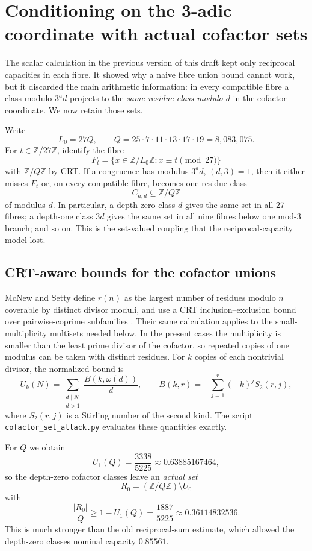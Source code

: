 \documentclass[11pt]{article}
\theoremstyle{definition}
\newcommand{\Z}{\mathbb Z}
\begin{document}
\section{Conditioning on the 3-adic coordinate with actual cofactor sets}\label{sec:cofactor}

The scalar calculation in the previous version of this draft kept only reciprocal capacities in
each fibre.  It showed why a naive fibre union bound cannot work, but it discarded the main
arithmetic information: in every compatible fibre a class modulo $3^a d$ projects to the
\emph{same residue class modulo $d$} in the cofactor coordinate.  We now retain those sets.

Write
\[
 L_0=27Q,\qquad Q=25\cdot7\cdot11\cdot13\cdot17\cdot19=8{,}083{,}075.
\]
For $t\in\Z/27\Z$, identify the fibre
\[
 F_t=\{x\in\Z/L_0\Z:x\equiv t\pmod{27}\}
\]
with $\Z/Q\Z$ by CRT.  If a congruence has modulus $3^a d$, $(d,3)=1$, then it either misses
$F_t$ or, on every compatible fibre, becomes one residue class
\[
 C_{a,d}\subseteq \Z/Q\Z
\]
of modulus $d$.  In particular, a depth-zero class $d$ gives the same set in all 27 fibres; a
depth-one class $3d$ gives the same set in all nine fibres below one mod-$3$ branch; and so on.
This is the set-valued coupling that the reciprocal-capacity model lost.

\subsection{CRT-aware bounds for the cofactor unions}

McNew and Setty define $r(n)$ as the largest number of residues modulo $n$ coverable by
distinct divisor moduli, and use a CRT inclusion--exclusion bound over pairwise-coprime
subfamilies \cite{McNewSetty2026}.  Their same calculation applies to the small-multiplicity
multisets needed below.  In the present cases the multiplicity is smaller than the least prime
divisor of the cofactor, so repeated copies of one modulus can be taken with distinct residues.
For $k$ copies of each nontrivial divisor, the normalized bound is
\[
 U_k(N)=\sum_{\substack{d\mid N\\d>1}}
 \frac{B(k,\omega(d))}{d},
 \qquad
 B(k,r)=-\sum_{j=1}^{r}(-k)^j S_2(r,j),
\]
where $S_2(r,j)$ is a Stirling number of the second kind.  The script
\texttt{cofactor\_set\_attack.py} evaluates these quantities exactly.

For $Q$ we obtain
\[
 U_1(Q)=\frac{3338}{5225}\approx0.63885167464,
\]
so the depth-zero cofactor classes leave an \emph{actual set}
\[
 R_0=(\Z/Q\Z)\setminus U_0
\]
with
\[
 \frac{|R_0|}{Q}\ge
 1-U_1(Q)=\frac{1887}{5225}\approx0.36114832536.
\]
This is much stronger than the old reciprocal-sum estimate, which allowed the depth-zero
classes nominal capacity $0.85561$.
\end{document}
